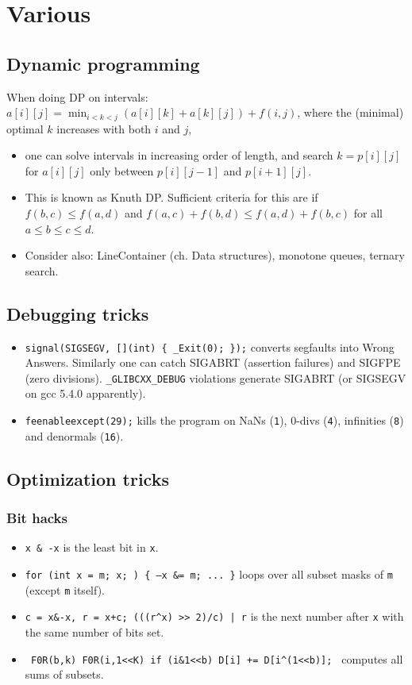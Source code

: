 \chapter{Various}

\section{Dynamic programming}

When doing DP on intervals: $a[i][j] = \min_{i < k < j}(a[i][k] + a[k][j]) + f(i, j)$, where the (minimal) optimal $k$ increases with both $i$ and $j$,
\begin{itemize}
\item one can solve intervals in increasing order of length, and search $k = p[i][j]$ for $a[i][j]$ only between $p[i][j-1]$ and $p[i+1][j]$.
\item This is known as Knuth DP. Sufficient criteria for this are if $f(b,c) \le f(a,d)$ and $f(a,c) + f(b,d) \le f(a,d) + f(b,c)$ for all $a \le b \le c \le d$.
\item Consider also: LineContainer (ch. Data structures), monotone queues, ternary search.
\end{itemize}


\section{Debugging tricks}
	\begin{itemize}
		\item \texttt{signal(SIGSEGV, [](int) \{ \_Exit(0); \});} converts segfaults into Wrong Answers.
			Similarly one can catch SIGABRT (assertion failures) and SIGFPE (zero divisions).
			\texttt{\_GLIBCXX\_DEBUG} violations generate SIGABRT (or SIGSEGV on gcc 5.4.0 apparently).
		\item \texttt{feenableexcept(29);} kills the program on NaNs (\texttt 1), 0-divs (\texttt 4), infinities (\texttt 8) and denormals (\texttt{16}).
	\end{itemize}

\section{Optimization tricks}
	\subsection{Bit hacks}
		\begin{itemize}
			\item \texttt{x \& -x} is the least bit in \texttt{x}.
			\item \texttt{for (int x = m; x; ) \{ --x \&= m; ... \}} loops over all subset masks of \texttt{m} (except \texttt{m} itself).
			\item \texttt{c = x\&-x, r = x+c; (((r\^{}x) >> 2)/c) | r} is the next number after \texttt{x} with the same number of bits set.
			\item \texttt{ F0R(b,k) F0R(i,1<<K) if (i\&1<<b) D[i] += D[i\^{}(1<<b)]; } computes all sums of subsets.
		\end{itemize}
